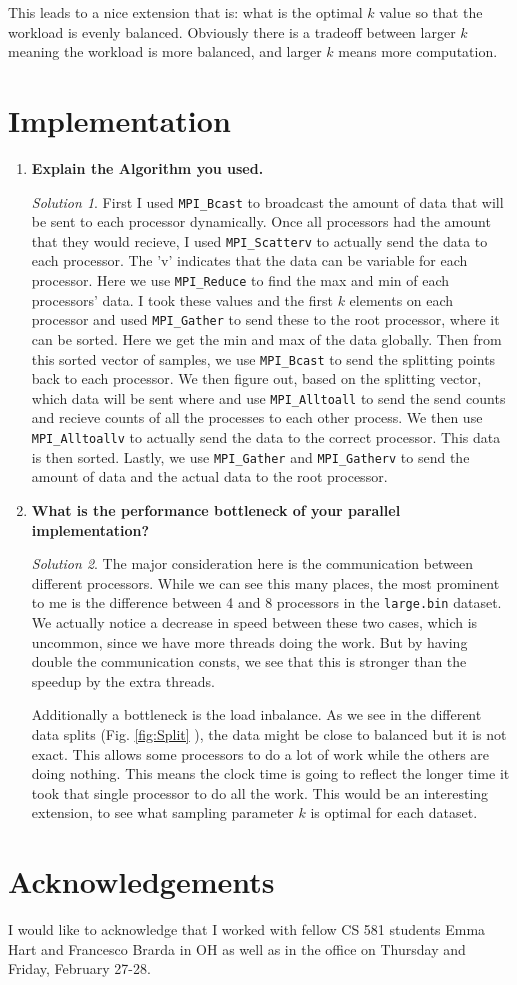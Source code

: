 \documentclass[a4paper,12pt]{article}
\theoremstyle{definition}
\theoremstyle{remark}
\newtheorem*{solution}{Solution}
\begin{document}
	This leads to a nice extension that is: what is the optimal $k$ value so that the workload is evenly balanced. Obviously there is a tradeoff between larger $k$ meaning the workload is more balanced, and larger $k$ means more computation.
	
	\section{Implementation}
	\begin{enumerate}
		\item \textbf{ Explain the Algorithm you used.}
		\begin{solution}
			First I used \texttt{MPI\_Bcast} to broadcast the amount of data that will be sent to each processor dynamically. Once all processors had the amount that they would recieve, I used \texttt{MPI\_Scatterv} to actually send the data to each processor. The 'v' indicates that the data can be variable for each processor. Here we use \texttt{MPI\_Reduce} to find the max and min of each processors' data. I  took these values and  the first $k$ elements on each processor and used \texttt{MPI\_Gather} to send these to the root processor, where it can be sorted. Here we get the min and max of the data globally. Then from this sorted vector of samples, we use \texttt{MPI\_Bcast} to send the splitting points back to each processor.  We then figure out, based on the splitting vector, which data will be sent where and use \texttt{MPI\_Alltoall} to send the send counts and recieve counts of all the processes to each other process. We then use \texttt{MPI\_Alltoallv} to actually send the data to the correct processor. This data is then sorted. Lastly, we use \texttt{MPI\_Gather} and \texttt{MPI\_Gatherv} to send the amount of data and the actual data to the root processor. 
		\end{solution}
		\item \textbf{What is the performance bottleneck of your parallel implementation?}
		\begin{solution}
			The major consideration here is the communication between different processors. While we can see this many places, the most prominent to me is the difference between 4 and 8 processors in the \texttt{large.bin} dataset. We actually notice a decrease in speed between these two cases, which is uncommon, since we have more threads doing the work. But by having double the communication consts, we see that this is stronger than the speedup by the extra threads. 
			
			Additionally a bottleneck is the load inbalance. As we see in the different data splits (Fig. \ref{fig:Split} ), the data might be close to balanced but it is not exact. This allows some processors to do a lot of work while the others are doing nothing. This means the clock time is going to reflect the longer time it took that single processor to do all the work. This would be an interesting extension, to see what sampling parameter $k$ is optimal for each dataset.
		\end{solution}
	\end{enumerate}
	
	
	
	\section*{Acknowledgements}
	I would like to acknowledge that I worked with fellow CS 581 students Emma Hart and Francesco Brarda in OH as well as in the office on Thursday and Friday, February 27-28.
	
\end{document}

